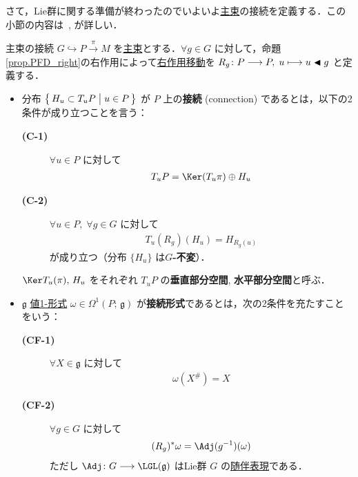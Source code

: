 \documentclass[TQFT_main]{subfiles}
\begin{document}
さて，Lie群に関する準備が終わったのでいよいよ\hyperref[def.PFD]{主束}の接続を定義する．この小節の内容は~\cite[第6章]{Imai2013diff}, \cite[\S 28]{Tu2017differential}が詳しい．


\begin{mydef}[label=def:connection,breakable]{主束の接続}
    $G \hookrightarrow P \xrightarrow{\pi} M$ を\hyperref[def.PFD]{主束}とする．$\forall g \in G$ に対して，命題\ref{prop.PFD_right}の右作用によって\hyperref[def:fundamental-vecf]{右作用移動}を $R_g \colon P \longrightarrow P,\; u \longmapsto u \blacktriangleleft g$ と定義する．
    \begin{itemize}
        \item 分布 $\bigl\{\, H_u \subset T_u P \bigm| u \in P \,\bigr\}$ が $P$ 上の\textbf{接続} (connection) であるとは，以下の2条件が成り立つことを言う：
        \begin{description}
            \item[\textbf{(C-1)}]  $\forall u \in P$ に対して
            \begin{align}
                T_u P = \Ker (T_u \pi) \oplus H_u
            \end{align}
            \item[\textbf{(C-2)}] $\forall u \in P,\; \forall g \in G$ に対して
            \begin{align}
                T_u(R_g) (H_u) = H_{R_g(u)}
            \end{align}
            が成り立つ（分布 $\{H_u\}$ は\textbf{$G$-不変}）．
        \end{description}
        $\Ker T_u (\pi),\, H_u$ をそれぞれ $T_u P$ の\textbf{垂直部分空間}, \textbf{水平部分空間}と呼ぶ．
        \item $\mathfrak{g}$ \hyperref[eq:E-valued]{値1-形式} $\omega \in \Omega^1(P;\, \mathfrak{g})$ が\textbf{接続形式}であるとは，次の2条件を充たすことをいう：
        \begin{description}
            \item[\textbf{(CF-1)}] $\forall X \in \mathfrak{g}$ に対して
            \begin{align}
                \omega(X^\#) = X
            \end{align}
            \item[\textbf{(CF-2)}] $\forall g \in G$ に対して
            \begin{align}
                (R_g)^* \omega = \Adj (g^{-1})(\omega)
            \end{align}
            ただし $\Adj \colon G \lto \LGL (\mathfrak{g})$ はLie群 $G$ の\hyperref[def:Lie-adj]{随伴表現}である．
        \end{description}
    \end{itemize}
    
\end{mydef}
\end{document}
